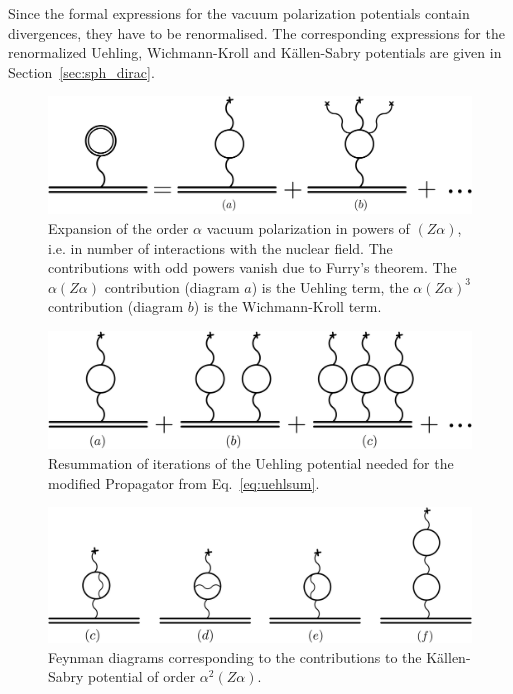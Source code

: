 Since the formal expressions for the vacuum polarization potentials contain divergences, they have to be renormalised. The corresponding expressions for the renormalized Uehling, Wichmann-Kroll and Källen-Sabry potentials are given in Section~\ref{sec:sph_dirac}.
%
\begin{figure}%
\centering
\includegraphics[width=0.75\linewidth]{pics/vac_pol_wk.pdf}%
\caption{Expansion of the order $\alpha$ vacuum polarization in powers of $(Z\alpha)$, i.e. in number of interactions with the nuclear field. The contributions with odd powers vanish due to Furry's theorem. The $\alpha(Z\alpha)$ contribution (diagram $a$) is the Uehling term, the $\alpha(Z\alpha)^3$ contribution (diagram $b$) is the Wichmann-Kroll term.}%
\label{fig:vac_pol_wk}%
\end{figure}
%
%
\begin{figure}%
\centering
\includegraphics[width=0.8\linewidth]{pics/vac_pol_uehl.pdf}%
\caption{Resummation of iterations of the Uehling potential needed for the modified Propagator from Eq.~\eqref{eq:uehlsum}.}%
\label{fig:vac_pol_uehl}%
\end{figure}
%
%
\begin{figure}%
\centering
\includegraphics[width=0.9\linewidth]{pics/vac_pol_ks.pdf}%
\caption{Feynman diagrams corresponding to the contributions to the Källen-Sabry potential of order $\alpha^2(Z\alpha)$.}%
\label{fig:vac_pol_ks}%
\end{figure}
%
